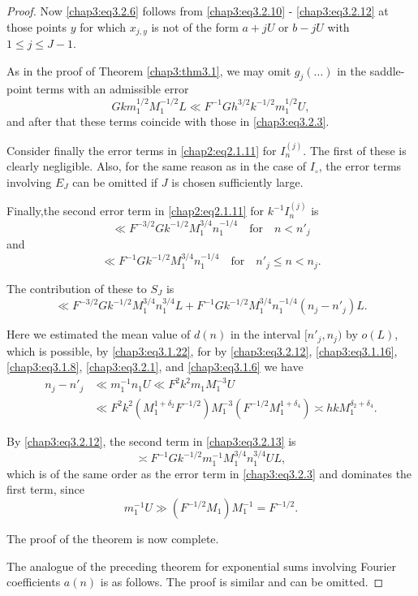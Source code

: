 \begin{proof}
Now \eqref{chap3:eq3.2.6} follows from \eqref{chap3:eq3.2.10} -
\eqref{chap3:eq3.2.12} at those points $y$ for which $x_{j,y}$ is not
of the form $a+jU$ or $b-jU$ with $1\leq j\leq J-1$. 

As in the proof of Theorem \ref{chap3:thm3.1}, we may omit
$g_j(\ldots)$ in the saddle-point terms with an admissible error
$$
Gkm_1^{1/2}M_1^{-1/2}L\ll F^{-1}Gh^{3/2}k^{-1/2}m_1^{1/2}U,
$$
and after that these terms coincide with those in
\eqref{chap3:eq3.2.3}.

Consider finally the error terms in \eqref{chap2:eq2.1.11} for
$I_n^{(j)}$. The first of these is clearly negligible. Also, for the
same reason as in the case of $I_\circ$, the error terms involving
$E_J$ can be omitted if $J$ is chosen sufficiently large.

Finally,\pageoriginale the second error term in \eqref{chap2:eq2.1.11}
for $k^{-1}I_n^{(j)}$ is 
$$
\ll F^{-3/2}Gk^{-1/2}M_1^{3/4}n_1^{-1/4}\quad\text{for}\quad n<n'_j
$$
and
$$
\ll F^{-1}Gk^{-1/2}M_1^{3/4}n_1^{-1/4}\quad\text{for}\quad n'_j\leq
n<n_j. 
$$

The contribution of these to $S_J$ is 
\begin{equation}\label{chap3:eq3.2.13}
\ll F^{-3/2}Gk^{-1/2}M_1^{3/4}n_1^{3/4}L+F^{-1}Gk^{-1/2}M_1^{3/4}
n_1^{-1/4}\left(n_j-n'_j\right)L.
\end{equation}

Here we estimated the mean value of $d(n)$ in the interval $[n'_j,
n_j)$ by  $o(L)$, which is possible, by \eqref{chap3:eq3.1.22}, for by
\eqref{chap3:eq3.2.12}, \eqref{chap3:eq3.1.16}, \eqref{chap3:eq3.1.8},
\eqref{chap3:eq3.2.1}, and \eqref{chap3:eq3.1.6} we have 
\begin{align*}
n_j-n'_j &\ll m_1^{-1}n_1U\ll F^2k^2m_1M_1^{-3}U\\
&\ll F^2k^2\left(M_1^{1+\delta_2}F^{-1/2}\right)M_1^{-3}
\left(F^{-1/2}M_1^{1+\delta_4}\right)\asymp hkM_1^{\delta_2+\delta_4}.
\end{align*}

By \eqref{chap3:eq3.2.12}, the second term in \eqref{chap3:eq3.2.13}
is 
$$
\asymp F^{-1}Gk^{-1/2}m_1^{-1}M_1^{3/4}n_1^{3/4}UL,
$$
which is of the same order as the error term in \eqref{chap3:eq3.2.3}
and dominates the first term, since
$$
m_1^{-1}U\gg \left(F^{-1/2}M_1\right)M_1^{-1}=F^{-1/2}.
$$

The proof of the theorem is now complete.

The analogue of the preceding theorem for exponential sums involving
Fourier coefficients $a(n)$ is as follows. The proof is similar and
can be omitted.
\end{proof}

